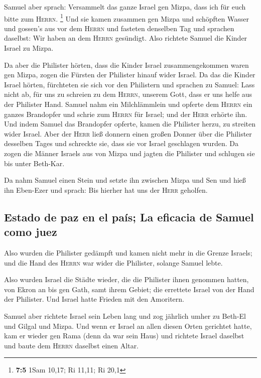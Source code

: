  Samuel aber sprach: Versammelt das ganze Israel gen
Mizpa, dass ich für euch bitte zum \textsc{Herrn}. \footnote{\textbf{7:5}
  1Sam 10,17; Ri 11,11; Ri 20,1}  Und sie kamen zusammen
gen Mizpa und schöpften Wasser und gossen's aus vor dem \textsc{Herrn}
und fasteten denselben Tag und sprachen daselbst: Wir haben an dem
\textsc{Herrn} gesündigt. Also richtete Samuel die Kinder Israel zu
Mizpa.

 Da aber die Philister hörten, dass die Kinder Israel
zusammengekommen waren gen Mizpa, zogen die Fürsten der Philister hinauf
wider Israel. Da das die Kinder Israel hörten, fürchteten sie sich vor
den Philistern  und sprachen zu Samuel: Lass nicht ab, für
uns zu schreien zu dem \textsc{Herrn}, unserem Gott, dass er uns helfe
aus der Philister Hand.  Samuel nahm ein Milchlämmlein und
opferte dem \textsc{Herrn} ein ganzes Brandopfer und schrie zum
\textsc{Herrn} für Israel; und der \textsc{Herr} erhörte ihn.
 Und indem Samuel das Brandopfer opferte, kamen die
Philister herzu, zu streiten wider Israel. Aber der \textsc{Herr} ließ
donnern einen großen Donner über die Philister desselben Tages und
schreckte sie, dass sie vor Israel geschlagen wurden.  Da
zogen die Männer Israels aus von Mizpa und jagten die Philister und
schlugen sie bis unter Beth-Kar.

 Da nahm Samuel einen Stein und setzte ihn zwischen Mizpa
und Sen und hieß ihn Eben-Ezer und sprach: Bis hierher hat uns der
\textsc{Herr} geholfen.

\hypertarget{estado-de-paz-en-el-pauxeds-la-eficacia-de-samuel-como-juez}{%
\subsection{Estado de paz en el país; La eficacia de Samuel como
juez}\label{estado-de-paz-en-el-pauxeds-la-eficacia-de-samuel-como-juez}}

 Also wurden die Philister gedämpft und kamen nicht mehr
in die Grenze Israels; und die Hand des \textsc{Herrn} war wider die
Philister, solange Samuel lebte.

 Also wurden Israel die Städte wieder, die die Philister
ihnen genommen hatten, von Ekron an bis gen Gath, samt ihrem Gebiet; die
errettete Israel von der Hand der Philister. Und Israel hatte Frieden
mit den Amoritern.

 Samuel aber richtete Israel sein Leben lang
 und zog jährlich umher zu Beth-El und Gilgal und Mizpa.
Und wenn er Israel an allen diesen Orten gerichtet hatte,
 kam er wieder gen Rama (denn da war sein Haus) und
richtete Israel daselbst und baute dem \textsc{Herrn} daselbst einen
Altar.

